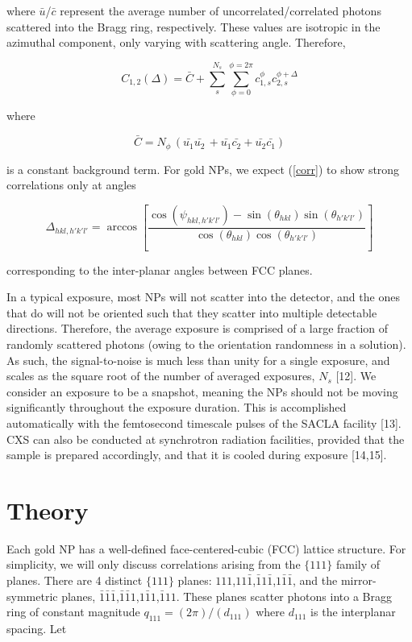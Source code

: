 \documentclass [11pt,fleqn]{article}
\def \be {\begin{equation}}
\def \ee {\end{equation}}
\begin{document}
where $\bar{u}$/$\bar{c}$ represent the average number of uncorrelated/correlated photons scattered into the Bragg ring, respectively. These values are isotropic in the azimuthal component, only varying with scattering angle. Therefore,

\be \label{corr2}
C_{1,2}(\Delta) = \bar C +  \sum_s^{N_s} \sum_{\phi=0}^{\phi=2\pi} c_{1,s}^\phi c_{2,s}^{\phi + \Delta}
\ee

where 

\be
\bar C = N_\phi \,( \bar{u_1} \bar{u_2}\, + \bar{u_1}\bar{c_2}  + \bar{u_2}\bar{c_1} )
\ee

is a constant background term. For gold NPs, we expect (\ref{corr}) to show strong correlations only at angles 

\be
\Delta_{hkl,h'k'l'} = \arccos\left [  \frac{ \cos(\psi_{hkl,h'k'l'}) - \sin(\theta_{hkl})\sin(\theta_{h'k'l'} ) }{ \cos(\theta_{hkl})\cos(\theta_{h'k'l'} ) } \right ] 
\ee

corresponding to the inter-planar angles between FCC planes.

In a typical exposure, most NPs will not scatter into the detector, and the ones that do will not be oriented such that they scatter into multiple detectable directions. Therefore, the average exposure is comprised of a large fraction of randomly scattered photons (owing to the orientation randomness in  a solution). As such, the signal-to-noise is much less than unity for a single exposure, and scales as the square root of the number of averaged exposures, $N_s$ [12]. We consider an exposure to be a snapshot, meaning the NPs should not be moving significantly throughout the exposure duration. This is accomplished automatically with the femtosecond timescale pulses of the SACLA facility [13].  CXS can also be conducted at synchrotron radiation facilities, provided  that the sample is prepared accordingly, and that it is cooled during exposure [14,15]. 

\section{Theory}
Each gold NP has a well-defined face-centered-cubic (FCC) lattice structure. For simplicity, we will only discuss correlations arising from the $\{111\}$ family of planes. There are 4 distinct $\{111\}$ planes: $111$,$11\bar 1$,$\bar 1 1\bar 1$,$1\bar 1 \bar 1$, and the mirror-symmetric planes, $\bar 1\bar 1\bar 1$,$\bar 1\bar 1 1$,$1 \bar 11$,$\bar 1 1 1$.  These planes scatter photons into a Bragg ring of constant magnitude $q_{111} = ( 2\pi ) / ( d_{111} )$ where $d_{111}$ is the interplanar spacing.  Let 
\end{document}

